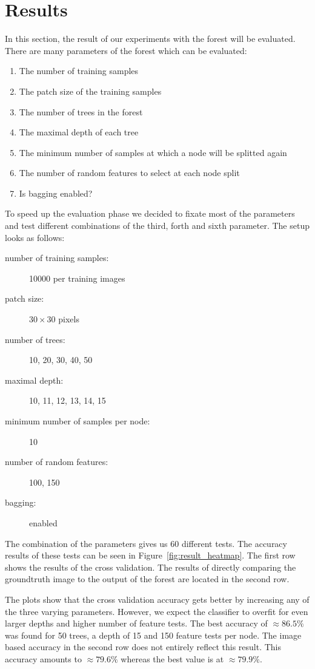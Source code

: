 \section{Results}
\label{sec:results}

In this section, the result of our experiments with the forest will be evaluated. There are many parameters
of the forest which can be evaluated:

\FloatBarrier
\begin{enumerate}
	\item The number of training samples
	\item The patch size of the training samples
	\item The number of trees in the forest
	\item The maximal depth of each tree
	\item The minimum number of samples at which a node will be splitted again
	\item The number of random features to select at each node split
	\item Is bagging enabled?
\end{enumerate}
\FloatBarrier

To speed up the evaluation phase we decided to fixate most of the parameters and test different combinations
of the third, forth and sixth parameter. The setup looks as follows:

\FloatBarrier
\begin{description}
	\item[number of training samples:] 10000 per training images
	\item[patch size:] $30 \times 30$ pixels
	\item[number of trees:] 10, 20, 30, 40, 50
	\item[maximal depth:] 10, 11, 12, 13, 14, 15
	\item[minimum number of samples per node:] 10
	\item[number of random features:] 100, 150
	\item[bagging:] enabled
\end{description}
\FloatBarrier

The combination of the parameters gives us 60 different tests. The accuracy results of these tests can be seen
in Figure~\ref{fig:result_heatmap}. The first row shows the results of the cross validation. The results
of directly comparing the groundtruth image to the output of the forest are located in the second row. 

The plots show that the cross validation accuracy gets better by increasing any of the three varying parameters.
However, we expect the classifier to overfit for even larger depths and higher number of feature tests. The best
accuracy of $\approx 86.5\%$ was found for 50 trees, a depth of 15 and 150 feature tests per node. The image based
accuracy in the second row does not entirely reflect this result. This accuracy amounts to $\approx 79.6\%$ whereas
the best value is at $\approx 79.9\%$.

